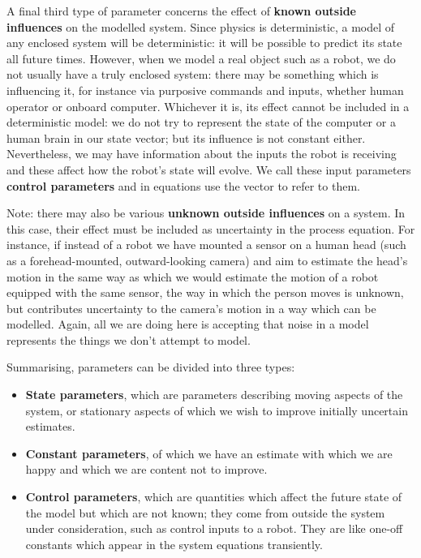 \documentclass{article}
\begin{document}
A final third type of parameter concerns the effect of {\bf known
  outside influences} on the modelled system. Since physics is
deterministic, a model of any enclosed system will be deterministic:
it will be possible to predict its state all future times. However,
when we model a real object such as a robot, we do not usually have a
truly enclosed system: there may be something which is influencing it,
for instance via purposive commands and inputs, whether human operator
or onboard computer. Whichever it is, its effect cannot be included in
a deterministic model: we do not try to represent the state of the
computer or a human brain in our state vector; but its influence is
not constant either. Nevertheless, we may have information about the
inputs the robot is receiving and these affect how the robot's state
will evolve. We call these input parameters {\bf control parameters}
and in equations use the vector {\vecu} to refer to them.

Note: there may also be various {\bf unknown outside influences} on a
system. In this case, their effect must be included as uncertainty in
the process equation. For instance, if instead of a robot we have
mounted a sensor on a human head (such as a forehead-mounted,
outward-looking camera) and aim to estimate the head's motion in the
same way as which we would estimate the motion of a robot equipped
with the same sensor, the way in which the person moves is unknown,
but contributes uncertainty to the camera's motion in a way which can
be modelled. Again, all we are doing here is accepting that noise in a
model represents the things we don't attempt to model.

Summarising, parameters can be divided into three types:
\begin{itemize}
\item {\bf State parameters}, which are parameters describing moving
  aspects of the system, or stationary aspects of which we wish to
  improve initially uncertain estimates.

\item {\bf Constant parameters}, of which we have an estimate with
  which we are happy and which we are content not to improve.

\item {\bf Control parameters}, which are quantities which affect the
  future state of the model but which are not known; they come from
  outside the system under consideration, such as control inputs to a
  robot. They are like one-off constants which appear in the system
  equations transiently.  
\end{itemize}
\end{document}
